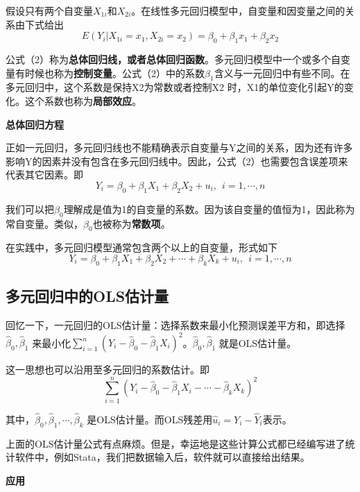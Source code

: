\documentclass[cn,12pt,math=newtx,citestyle=gb7714-2015,bibstyle=gb7714-2015]{elegantbook}
\begin{document}
	假设只有两个自变量$X_{1i}$和$X_{2i}$。在线性多元回归模型中，自变量和因变量之间的关系由下式给出
	\begin{equation}
		E(Y_i|X_{1i}=x_1,X_{2i}=x_2)=\beta_0+\beta_1x_1+\beta_2x_2
	\end{equation}
	
	公式（2）称为\textbf{总体回归线，或者总体回归函数}。多元回归模型中一个或多个自变量有时候也称为\textbf{控制变量}。公式（2）中的系数$\beta_1$含义与一元回归中有些不同。在多元回归中，这个系数是保持X2为常数或者控制X2 时，X1的单位变化引起Y的变化。这个系数也称为\textbf{局部效应}。
	
	\textbf{总体回归方程}
	
	正如一元回归，多元回归线也不能精确表示自变量与Y之间的关系，因为还有许多影响Y的因素并没有包含在多元回归线中。因此，公式（2）也需要包含误差项来代表其它因素。即
	\begin{equation}
		Y_i=\beta_0+\beta_1X_1+\beta_2X_2+u_i,~~i=1,\cdots,n
	\end{equation}
	
	我们可以把$\beta_0$理解成是值为1的自变量的系数。因为该自变量的值恒为1，因此称为常自变量。类似，$\beta_0$也被称为\textbf{常数项}。
	
	在实践中，多元回归模型通常包含两个以上的自变量，形式如下
	\begin{equation}
		Y_i=\beta_0+\beta_1X_1+\beta_2X_2+\cdots+\beta_kX_k+u_i,~~i=1,\cdots,n
	\end{equation}
	
	\subsection{多元回归中的OLS估计量}
	回忆一下，一元回归的OLS估计量：选择系数来最小化预测误差平方和，即选择$\hat{\beta}_0,\hat{\beta}_1$ 来最小化$\sum_{i=1}^{n}{(Y_i-\hat{\beta}_0-\hat{\beta}_1X_i)^2}$。$\hat{\beta}_0,\hat{\beta}_1$ 就是OLS估计量。
	
	这一思想也可以沿用至多元回归的系数估计。即
	\begin{equation}
		\sum_{i=1}^{n}{(Y_i-\hat{\beta}_0-\hat{\beta}_1X_i-\cdots-\hat{\beta}_kX_k)^2}
	\end{equation}
	
	其中，$\hat{\beta}_0,\hat{\beta}_1,\cdots,\hat{\beta}_k$ 是OLS估计量。而OLS残差用$\hat{u}_i=Y_i-\hat{Y}_i$表示。
	
	上面的OLS估计量公式有点麻烦。但是，幸运地是这些计算公式都已经编写进了统计软件中，例如Stata，我们把数据输入后，软件就可以直接给出结果。
	
	\textbf{应用}
	
\end{document}
